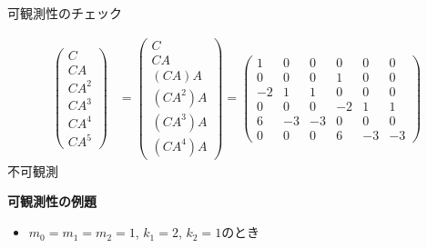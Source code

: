 \documentclass[a4paper,11pt,fleqn]{jreport}
\begin{document}
可観測性のチェック

\begin{align}
 \left(\begin{array}{l}
        C \\
        CA \\
        CA^2  \\
	CA^3 \\
	CA^4 \\
	CA^5
       \end{array}\right)
 &=
 \left(\begin{array}{l}
        C \\
        CA \\
        (CA)A  \\
	(CA^2)A \\
	(CA^3)A \\
	(CA^4)A
       \end{array}\right)
 =
 \left(\begin{array}{rrrrrr}
        1 & 0 & 0 & 0 & 0 & 0      \\
        0 & 0 & 0 & 1 & 0 & 0      \\
        -2& 1 & 1 & 0 & 0 & 0      \\
	0 & 0 & 0 & -2& 1 & 1 \\
	6 & -3& -3& 0 & 0 & 0 \\
	0 & 0 & 0 & 6 & -3& -3 
       \end{array}\right)
\nonumber
\end{align}
不可観測




\newpage
\noindent
{\bf 可観測性の例題}

\begin{itemize}
\item $m_0=m_1=m_2=1$, $k_1=2$, $k_2=1$のとき
\end{itemize}
\end{document}
